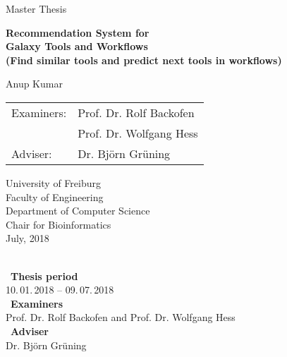 \begin{titlepage}
\begin{center}

\newcommand{\HorizontalLine}{\rule{\linewidth}{0.3mm}}

{\Large Master Thesis}\\[2cm]


% 
\begin{spacing}{3}
    {\huge \bfseries Recommendation System for } \\
    {\huge \bfseries Galaxy Tools and Workflows } \\
    {\Large \bfseries (Find similar tools and predict next tools in workflows) }\\[2cm]
\end{spacing}


{\Large Anup Kumar } \\[2cm]


\begin{tabular}[hc]{>{\Large}l >{\Large}l}
  Examiners: & Prof. Dr. Rolf Backofen \\[0.3cm]
             & Prof. Dr. Wolfgang Hess \\[0.3cm]
  Adviser: & Dr. Björn Grüning \\[2cm]
  
\end{tabular}
\vfill  %

\Large {
    University of Freiburg\\
    Faculty of Engineering\\
    Department of Computer Science\\
    Chair for Bioinformatics\\[0.5cm]
    July, 2018
    \\
}
\end{center}
\end{titlepage}

\ \vfill \ \\  %
\
\textbf{Thesis period}            \smallskip{} \\
10.\,01.\,2018 -- 09.\,07.\,2018   \bigskip{} \\
\
\textbf{Examiners}                 \smallskip{} \\
Prof. Dr. Rolf Backofen and Prof. Dr. Wolfgang Hess               \bigskip{} \\
\
\textbf{Adviser}                   \smallskip{} \\
Dr. Björn Grüning
